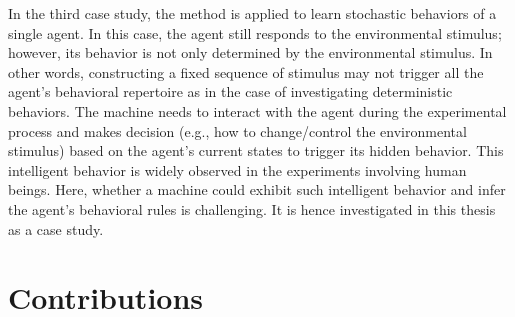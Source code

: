 In the third case study, the method is applied to learn stochastic behaviors of a single agent. In this case, the agent still responds to the environmental stimulus; however, its behavior is not only determined by the environmental stimulus. In other words, constructing a fixed sequence of stimulus may not trigger all the agent's behavioral repertoire as in the case of investigating deterministic behaviors. The machine needs to interact with the agent during the experimental process and makes decision (e.g., how to change/control the environmental stimulus) based on the agent's current states to trigger its hidden behavior. This intelligent behavior is widely observed in the experiments involving human beings. Here, whether a machine could exhibit such intelligent behavior and infer the agent's behavioral rules is challenging. It is hence investigated in this thesis as a case study.  


\section{Contributions}

